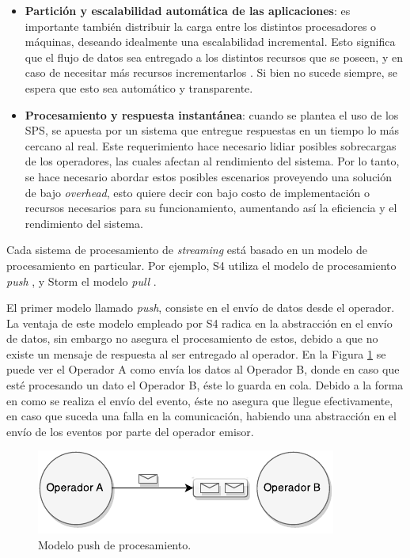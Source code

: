 \begin{itemize}
	\item \textbf{Partición y escalabilidad automática de las aplicaciones}: es importante también distribuir la carga entre los distintos procesadores o máquinas, deseando idealmente una escalabilidad incremental. Esto significa que el flujo de datos sea entregado a los distintos recursos que se poseen, y en caso de necesitar más recursos incrementarlos \citep{bookTanenbaum}. Si bien no sucede siempre, se espera que esto sea automático y transparente.
	\item \textbf{Procesamiento y respuesta instantánea}: cuando se plantea el uso de los SPS, se apuesta por un sistema que entregue respuestas en un tiempo lo más cercano al real. Este requerimiento hace necesario lidiar posibles sobrecargas de los operadores, las cuales afectan al rendimiento del sistema. Por lo tanto, se hace necesario abordar estos posibles escenarios proveyendo una solución de bajo \textit{overhead}, esto quiere decir con bajo costo de implementación o recursos necesarios para su funcionamiento, aumentando así la eficiencia y el rendimiento del sistema.
\end{itemize}

Cada sistema de procesamiento de \textsl{streaming} está basado en un modelo de procesamiento en particular. Por ejemplo, S4 utiliza el modelo de procesamiento \textsl{push} \citep{s4yahoo}, y Storm el modelo \textsl{pull} \citep{stormtwitter}.

El primer modelo llamado \textit{push}, consiste en el envío de datos desde el operador. La ventaja de este modelo empleado por S4 radica en la abstracción en el envío de datos, sin embargo no asegura el procesamiento de estos, debido a que no existe un mensaje de respuesta al ser entregado al operador. En la Figura \ref{fig:sps-push} se puede ver el Operador A como envía los datos al Operador B, donde en caso que esté procesando un dato el Operador B, éste lo guarda en cola. Debido a la forma en como se realiza el envío del evento, éste no asegura que llegue efectivamente, en caso que suceda una falla en la comunicación, habiendo una abstracción en el envío de los eventos por parte del operador emisor.

\begin{figure}[ht!]
  \centering
    \includegraphics[scale=1]{images/SPS-Push.pdf}
  \caption{Modelo push de procesamiento.}
  \label{fig:sps-push}
\end{figure}

